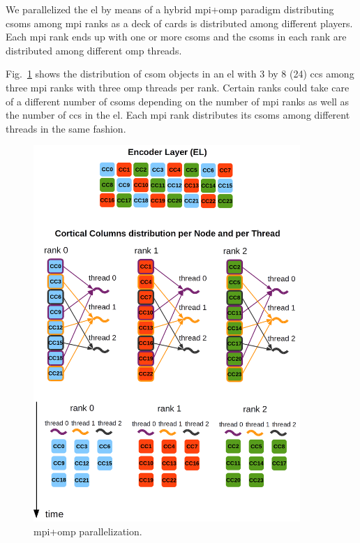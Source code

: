 {We parallelized the \gls{el} by means of a hybrid \gls{mpi}+\gls{omp} paradigm distributing \glspl{csom} among \gls{mpi} ranks as a deck of cards is distributed among different players. Each \gls{mpi} rank ends up with one or more \glspl{csom} and the \glspl{csom} in each rank are distributed among different \gls{omp} threads.%

Fig.~\ref{fig:Encoder_Parallelization} shows the distribution of \gls{csom} objects in an \gls{el} with 3 by 8 (24) \glspl{cc} among three \gls{mpi} ranks with three \gls{omp} threads per rank. Certain ranks could take care of a different number of \glspl{csom} depending on the number of \gls{mpi} ranks as well as the number of \glspl{cc} in the \gls{el}. Each \gls{mpi} rank distributes its \glspl{csom} among different threads in the same fashion.

\begin{figure}[h!]
    \centering
    \includegraphics[width=0.9\textwidth]{Encoder_Parallelization.png}
    \caption{ \gls{mpi}+\gls{omp} parallelization.}
    \label{fig:Encoder_Parallelization}
\end{figure}

}
